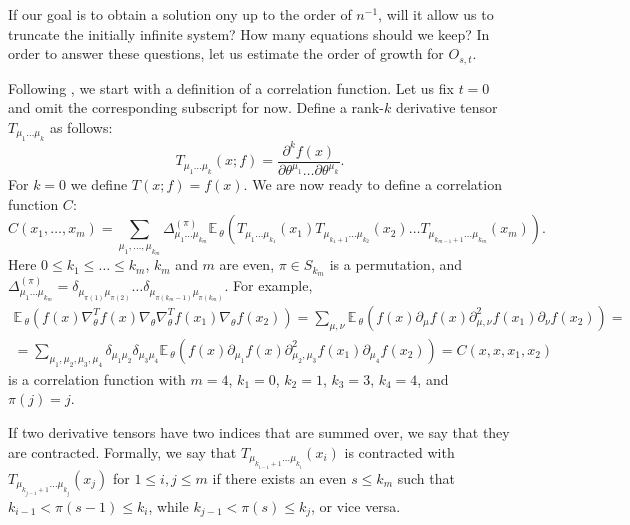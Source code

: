 \documentclass{article}
\newcommand{\EE}{\mathbb{E}\,}
\begin{document}
    If our goal is to obtain a solution ony up to the order of $n^{-1}$, will it allow us to truncate the initially infinite system?
    How many equations should we keep?
    In order to answer these questions, let us estimate the order of growth for $O_{s,t}$.

    Following \cite{Dyer2020Asymptotics}, we start with a definition of a correlation function.
    Let us fix $t=0$ and omit the corresponding subscript for now.
    Define a rank-$k$ derivative tensor $T_{\mu_1 \ldots \mu_k}$ as follows:
    \begin{equation}
        T_{\mu_1 \ldots \mu_k}(x; f) =
        \frac{\partial^k f(x)}{\partial \theta^{\mu_1} \ldots \partial \theta^{\mu_k}}.
    \end{equation}
    For $k=0$ we define $T(x; f) = f(x)$.
    We are now ready to define a correlation function $C$:
    \begin{equation}
        C(x_1,\ldots,x_m) =
        \sum_{\mu_1,\ldots,\mu_{k_m}} \Delta_{\mu_1 \ldots \mu_{k_m}}^{(\pi)} \EE_\theta \left(
            T_{\mu_1 \ldots \mu_{k_1}}(x_1) T_{\mu_{k_1+1} \ldots \mu_{k_2}}(x_2) \ldots T_{\mu_{k_{m-1}+1} \ldots \mu_{k_m}}(x_m) 
        \right).
    \end{equation}
    Here $0 \leq k_1 \leq \ldots \leq k_m$, $k_m$ and $m$ are even, $\pi \in S_{k_m}$ is a permutation, and $\Delta_{\mu_1 \ldots \mu_{k_m}}^{(\pi)} = \delta_{\mu_{\pi(1)} \mu_{\pi(2)}} \ldots \delta_{\mu_{\pi(k_m-1)} \mu_{\pi(k_m)}}$.
    For example, 
    \begin{multline}
        \EE_\theta (f(x) \nabla^T_\theta f(x) \nabla_\theta \nabla^T_\theta f(x_1) \nabla_\theta f(x_2)) = 
        \sum_{\mu,\nu} \EE_\theta (f(x) \partial_\mu f(x) \partial^2_{\mu,\nu} f(x_1) \partial_\nu f(x_2)) =\\= 
        \sum_{\mu_1,\mu_2,\mu_3,\mu_4} \delta_{\mu_1 \mu_2} \delta_{\mu_3 \mu_4} \EE_\theta (f(x) \partial_{\mu_1} f(x) \partial^2_{\mu_2,\mu_3} f(x_1) \partial_{\mu_4} f(x_2)) =
        C(x,x,x_1,x_2)
        \label{eq:dtheta_dt_as_corr_f}
    \end{multline}
    is a correlation function with $m=4$, $k_1=0$, $k_2=1$, $k_3=3$, $k_4=4$, and $\pi(j) = j$.

    If two derivative tensors have two indices that are summed over, we say that they are contracted.
    Formally, we say that $T_{\mu_{k_{i-1}+1} \ldots \mu_{k_i}}(x_i)$ is contracted with $T_{\mu_{k_{j-1}+1} \ldots \mu_{k_j}}(x_j)$ for $1 \leq i,j \leq m$ if there exists an even $s \leq k_m$ such that $k_{i-1} < \pi(s-1) \leq k_i$, while $k_{j-1} < \pi(s) \leq k_j$, or vice versa.
\end{document}
